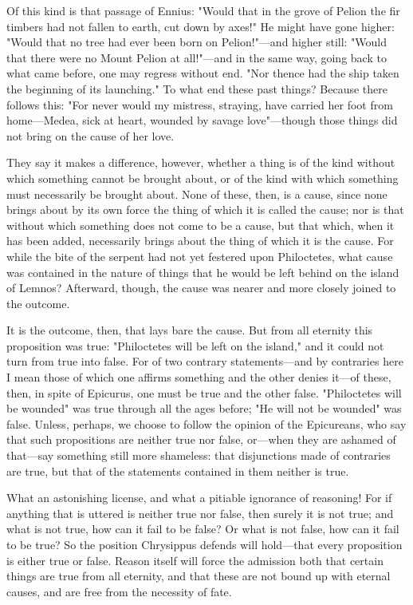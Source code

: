  Of this kind is that passage of Ennius: "Would that in the grove of Pelion the fir timbers had not fallen to earth, cut down by axes!" He might have gone higher: "Would that no tree had ever been born on Pelion!"—and higher still: "Would that there were no Mount Pelion at all!"—and in the same way, going back to what came before, one may regress without end. "Nor thence had the ship taken the beginning of its launching." To what end these past things? Because there follows this: "For never would my mistress, straying, have carried her foot from home—Medea, sick at heart, wounded by savage love"—though those things did not bring on the cause of her love.

 They say it makes a difference, however, whether a thing is of the kind without which something cannot be brought about, or of the kind with which something must necessarily be brought about. None of these, then, is a cause, since none brings about by its own force the thing of which it is called the cause; nor is that without which something does not come to be a cause, but that which, when it has been added, necessarily brings about the thing of which it is the cause. For while the bite of the serpent had not yet festered upon Philoctetes, what cause was contained in the nature of things that he would be left behind on the island of Lemnos? Afterward, though, the cause was nearer and more closely joined to the outcome.

 It is the outcome, then, that lays bare the cause. But from all eternity this proposition was true: "Philoctetes will be left on the island," and it could not turn from true into false. For of two contrary statements—and by contraries here I mean those of which one affirms something and the other denies it—of these, then, in spite of Epicurus, one must be true and the other false. "Philoctetes will be wounded" was true through all the ages before; "He will not be wounded" was false. Unless, perhaps, we choose to follow the opinion of the Epicureans, who say that such propositions are neither true nor false, or—when they are ashamed of that—say something still more shameless: that disjunctions made of contraries are true, but that of the statements contained in them neither is true.

 What an astonishing license, and what a pitiable ignorance of reasoning! For if anything that is uttered is neither true nor false, then surely it is not true; and what is not true, how can it fail to be false? Or what is not false, how can it fail to be true? So the position Chrysippus defends will hold—that every proposition is either true or false. Reason itself will force the admission both that certain things are true from all eternity, and that these are not bound up with eternal causes, and are free from the necessity of fate.


